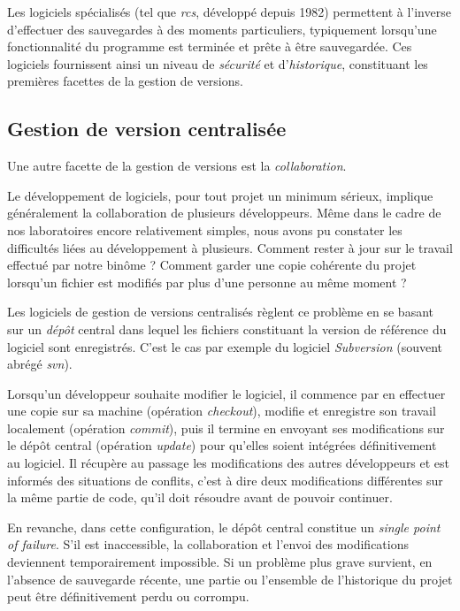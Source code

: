 \documentclass[11pt,a4paper]{article}
\begin{document}
Les logiciels spécialisés (tel que \textit{rcs}, développé depuis 1982) permettent à l'inverse d'effectuer des sauvegardes à des moments particuliers, typiquement lorsqu'une fonctionnalité du programme est terminée et prête à être sauvegardée.
Ces logiciels fournissent ainsi un niveau de \textit{sécurité} et d'\textit{historique}, constituant les premières facettes de la gestion de versions.

\subsection{Gestion de version centralisée}

Une autre facette de la gestion de versions est la \textit{collaboration}. 

Le développement de logiciels, pour tout projet un minimum sérieux, implique généralement la collaboration de plusieurs développeurs.
Même dans le cadre de nos laboratoires encore relativement simples, nous avons pu constater les difficultés liées au développement à plusieurs.
Comment rester à jour sur le travail effectué par notre binôme ?
Comment garder une copie cohérente du projet lorsqu'un fichier est modifiés par plus d'une personne au même moment ?

Les logiciels de gestion de versions centralisés règlent ce problème en se basant sur un \textit{dépôt} central dans lequel les fichiers constituant la version de référence du logiciel sont enregistrés.
C'est le cas par exemple du logiciel \textit{Subversion} (souvent abrégé \textit{svn}).

Lorsqu'un développeur souhaite modifier le logiciel, il commence par en effectuer une copie sur sa machine (opération \textit{checkout}), modifie et enregistre son travail localement (opération \textit{commit}), puis il termine en envoyant ses modifications sur le dépôt central (opération \textit{update}) pour qu'elles soient intégrées définitivement au logiciel.
Il récupère au passage les modifications des autres développeurs et est informés des situations de conflits, c'est à dire deux modifications différentes sur la même partie de code, qu'il doit résoudre avant de pouvoir continuer.

En revanche, dans cette configuration, le dépôt central constitue un \textit{single point of failure}.
S'il est inaccessible, la collaboration et l'envoi des modifications deviennent temporairement impossible.
Si un problème plus grave survient, en l'absence de sauvegarde récente, une partie ou l'ensemble de l'historique du projet peut être définitivement perdu ou corrompu.
\end{document}

